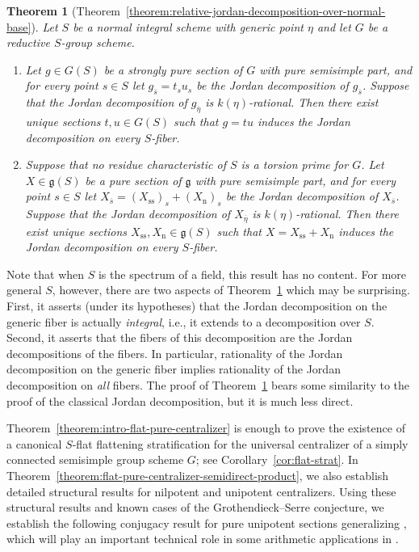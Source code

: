 \documentclass[11pt,reqno]{amsart}
\newtheorem{theorem}{Theorem}[section]
\theoremstyle{definition}
\renewcommand{\rm}{\mathrm}
\newcommand{\fg}{\mathfrak{g}}
\begin{document}
\begin{theorem}[Theorem~\ref{theorem:relative-jordan-decomposition-over-normal-base}]\label{theorem:intro-jordan}
Let $S$ be a normal integral scheme with generic point $\eta$ and let $G$ be a reductive $S$-group scheme.
\begin{enumerate}
    \item Let $g \in G(S)$ be a strongly pure section of $G$ with pure semisimple part, and for every point $s \in S$ let $g_{\overline{s}} = t_s u_s$ be the Jordan decomposition of $g_{\overline{s}}$. Suppose that the Jordan decomposition of $g_{\overline{\eta}}$ is $k(\eta)$-rational. Then there exist unique sections $t, u \in G(S)$ such that $g = tu$ induces the Jordan decomposition on every $S$-fiber.
    \item Suppose that no residue characteristic of $S$ is a torsion prime for $G$. Let $X \in \fg(S)$ be a pure section of $\fg$ with pure semisimple part, and for every point $s \in S$ let $X_{\overline{s}} = (X_{\rm{ss}})_s + (X_{\rm{n}})_s$ be the Jordan decomposition of $X_{\overline{s}}$. Suppose that the Jordan decomposition of $X_{\overline{\eta}}$ is $k(\eta)$-rational. Then there exist unique sections $X_{\rm{ss}}, X_{\rm{n}} \in \fg(S)$ such that $X = X_{\rm{ss}} + X_{\rm{n}}$ induces the Jordan decomposition on every $S$-fiber.
\end{enumerate}
\end{theorem}

Note that when $S$ is the spectrum of a field, this result has no content. For more general $S$, however, there are two aspects of Theorem~\ref{theorem:intro-jordan} which may be surprising. First, it asserts (under its hypotheses) that the Jordan decomposition on the generic fiber is actually \textit{integral}, i.e., it extends to a decomposition over $S$. Second, it asserts that the fibers of this decomposition are the Jordan decompositions of the fibers. In particular, rationality of the Jordan decomposition on the generic fiber implies rationality of the Jordan decomposition on \textit{all} fibers. The proof of Theorem~\ref{theorem:intro-jordan} bears some similarity to the proof of the classical Jordan decomposition, but it is much less direct.\smallskip

Theorem~\ref{theorem:intro-flat-pure-centralizer} is enough to prove the existence of a canonical $S$-flat flattening stratification for the universal centralizer of a simply connected semisimple group scheme $G$; see Corollary~\ref{cor:flat-strat}. In Theorem~\ref{theorem:flat-pure-centralizer-semidirect-product}, we also establish detailed structural results for nilpotent and unipotent centralizers. Using these structural results and known cases of the Grothendieck--Serre conjecture, we establish the following conjugacy result for pure unipotent sections generalizing \cite[Thm.\ 1.6.1(c)]{McNinch-local-fields}, which will play an important technical role in some arithmetic applications in \cite{booher-tang}.
\end{document}
